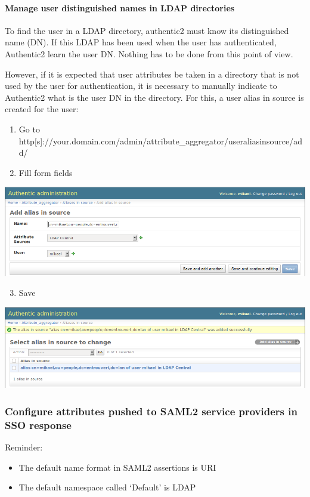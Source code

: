 \documentclass[letterpaper,10pt,english]{sphinxmanual}
\begin{document}
\paragraph{Manage user distinguished names in LDAP directories}
\label{attribute_management:manage-user-distinguished-names-in-ldap-directories}
To find the user in a LDAP directory, authentic2 must know its distinguished
name (DN). If this LDAP has been used when the user has authenticated,
Authentic2 learn the user DN. Nothing has to be done from this point of view.

However, if it is expected that user attributes be taken in a directory that
is not used by the user for authentication, it is necessary to manually
indicate to Authentic2 what is the user DN in the directory. For this, a
user alias in source is created for the user:
\begin{enumerate}
\item {} 
Go to http{[}s{]}://your.domain.com/admin/attribute\_aggregator/useraliasinsource/add/

\item {} 
Fill form fields

\end{enumerate}

\includegraphics{alias_in_source.png}
\begin{enumerate}
\setcounter{enumi}{2}
\item {} 
Save

\end{enumerate}

\includegraphics{alias_in_source_saved.png}


\subsubsection{Configure attributes pushed to SAML2 service providers in SSO response}
\label{attribute_management:configure-attributes-pushed-to-saml2-service-providers-in-sso-response}
Reminder:
\begin{itemize}
\item {} 
The default name format in SAML2 assertions is URI

\item {} 
The default namespace called `Default' is LDAP

\end{itemize}
\end{document}
